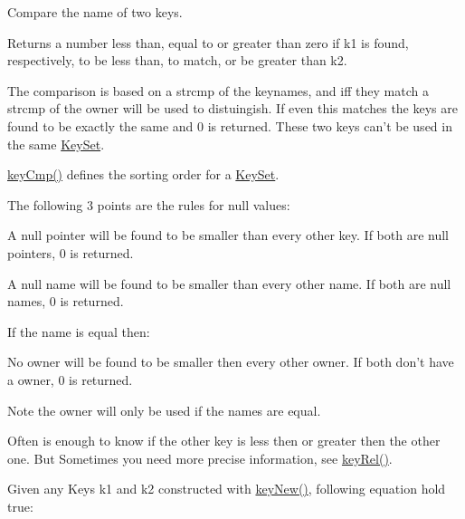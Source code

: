 Compare the name of two keys.  

\begin{DoxyReturn}{Returns}
a number less than, equal to or greater than zero if k1 is found, respectively, to be less than, to match, or be greater than k2.
\end{DoxyReturn}
The comparison is based on a strcmp of the keynames, and iff they match a strcmp of the owner will be used to distuingish. If even this matches the keys are found to be exactly the same and 0 is returned. These two keys can't be used in the same \hyperlink{classkdb_1_1KeySet}{Key\-Set}.

\hyperlink{group__keytest_gaf6e66e12fe04d535a5d1c8218ced803e}{key\-Cmp()} defines the sorting order for a \hyperlink{classkdb_1_1KeySet}{Key\-Set}.

The following 3 points are the rules for null values\-:


\begin{DoxyItemize}
\item A null pointer will be found to be smaller than every other key. If both are null pointers, 0 is returned.
\end{DoxyItemize}


\begin{DoxyItemize}
\item A null name will be found to be smaller than every other name. If both are null names, 0 is returned.
\end{DoxyItemize}

If the name is equal then\-:


\begin{DoxyItemize}
\item No owner will be found to be smaller then every other owner. If both don't have a owner, 0 is returned.
\end{DoxyItemize}

\begin{DoxyNote}{Note}
the owner will only be used if the names are equal.
\end{DoxyNote}
Often is enough to know if the other key is less then or greater then the other one. But Sometimes you need more precise information, see \hyperlink{group__keytest_ga6bb0f95ac34ce9c42d61bb35a76139d0}{key\-Rel()}.

Given any Keys k1 and k2 constructed with \hyperlink{group__key_gad23c65b44bf48d773759e1f9a4d43b89}{key\-New()}, following equation hold true\-:


